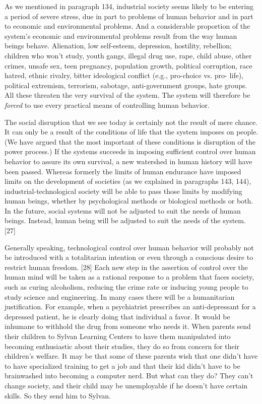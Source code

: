  As we mentioned in paragraph 134, industrial society seems likely to be entering a period of severe stress, due in part to problems of human behavior and in part to economic and environmental problems. And a considerable proportion of the system’s economic and environmental problems result from the way human beings behave. Alienation, low self-esteem, depression, hostility, rebellion; children who won’t study, youth gangs, illegal drug use, rape, child abuse, other crimes, unsafe sex, teen pregnancy, population growth, political corruption, race hatred, ethnic rivalry, bitter ideological conflict (e.g., pro-choice vs. pro- life), political extremism, terrorism, sabotage, anti-government groups, hate groups. All these threaten the very survival of the system. The system will therefore be {\em forced} to use every practical means of controlling human behavior.

 The social disruption that we see today is certainly not the result of mere chance. It can only be a result of the conditions of life that the system imposes on people. (We have argued that the most important of these conditions is disruption of the power process.) If the systems succeeds in imposing sufficient control over human behavior to assure its own survival, a new watershed in human history will have been passed. Whereas formerly the limits of human endurance have imposed limits on the development of societies (as we explained in paragraphs 143, 144), industrial-technological society will be able to pass those limits by modifying human beings, whether by psychological methods or biological methods or both. In the future, social systems will not be adjusted to suit the needs of human beings. Instead, human being will be adjusted to suit the needs of the system. [27]

 Generally speaking, technological control over human behavior will probably not be introduced with a totalitarian intention or even through a conscious desire to restrict human freedom. [28] Each new step in the assertion of control over the human mind will be taken as a rational response to a problem that faces society, such as curing alcoholism, reducing the crime rate or inducing young people to study science and engineering. In many cases there will be a humanitarian justification. For example, when a psychiatrist prescribes an anti-depressant for a depressed patient, he is clearly doing that individual a favor. It would be inhumane to withhold the drug from someone who needs it. When parents send their children to Sylvan Learning Centers to have them manipulated into becoming enthusiastic about their studies, they do so from concern for their children’s welfare. It may be that some of these parents wish that one didn’t have to have specialized training to get a job and that their kid didn’t have to be brainwashed into becoming a computer nerd. But what can they do? They can’t change society, and their child may be unemployable if he doesn’t have certain skills. So they send him to Sylvan.


